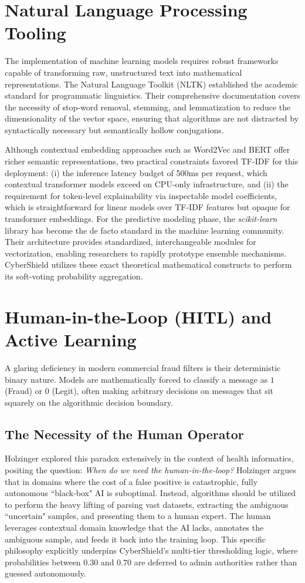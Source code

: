 \section{Natural Language Processing Tooling}
The implementation of machine learning models requires robust frameworks capable of transforming raw, unstructured text into mathematical representations. The Natural Language Toolkit (NLTK) established the academic standard for programmatic linguistics. Their comprehensive documentation covers the necessity of stop-word removal, stemming, and lemmatization to reduce the dimensionality of the vector space, ensuring that algorithms are not distracted by syntactically necessary but semantically hollow conjugations.

Although contextual embedding approaches such as Word2Vec and BERT offer richer semantic representations, two practical constraints favored TF-IDF for this deployment: (i) the inference latency budget of 500ms per request, which contextual transformer models exceed on CPU-only infrastructure, and (ii) the requirement for token-level explainability via inspectable model coefficients, which is straightforward for linear models over TF-IDF features but opaque for transformer embeddings. For the predictive modeling phase, the \textit{scikit-learn} library has become the de facto standard in the machine learning community. Their architecture provides standardized, interchangeable modules for vectorization, enabling researchers to rapidly prototype ensemble mechanisms. CyberShield utilizes these exact theoretical mathematical constructs to perform its soft-voting probability aggregation.

\section{Human-in-the-Loop (HITL) and Active Learning}
A glaring deficiency in modern commercial fraud filters is their deterministic binary nature. Models are mathematically forced to classify a message as $1$ (Fraud) or $0$ (Legit), often making arbitrary decisions on messages that sit squarely on the algorithmic decision boundary. 

\subsection{The Necessity of the Human Operator}
Holzinger \cite{holzinger2016interactive} explored this paradox extensively in the context of health informatics, positing the question: \textit{When do we need the human-in-the-loop?} Holzinger argues that in domains where the cost of a false positive is catastrophic, fully autonomous ``black-box" AI is suboptimal. Instead, algorithms should be utilized to perform the heavy lifting of parsing vast datasets, extracting the ambiguous ``uncertain" samples, and presenting them to a human expert. The human leverages contextual domain knowledge that the AI lacks, annotates the ambiguous sample, and feeds it back into the training loop. This specific philosophy explicitly underpins CyberShield's multi-tier thresholding logic, where probabilities between $0.30$ and $0.70$ are deferred to admin authorities rather than guessed autonomously.

